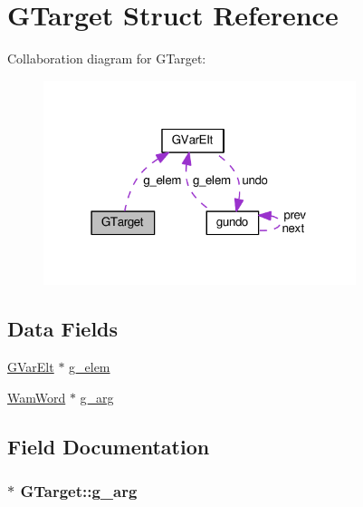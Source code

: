\hypertarget{structGTarget}{}\section{G\+Target Struct Reference}
\label{structGTarget}


Collaboration diagram for G\+Target\+:\nopagebreak
\begin{figure}[H]
\begin{center}
\leavevmode
\includegraphics[width=259pt]{structGTarget__coll__graph}
\end{center}
\end{figure}
\subsection*{Data Fields}
\begin{DoxyCompactItemize}
\item 
\hyperlink{structGVarElt}{G\+Var\+Elt} $\ast$ \hyperlink{structGTarget_a057eea84bfa93fdfb38a7bf7d1bea531}{g\+\_\+elem}
\item 
\hyperlink{LINUX__SIGSEGV_8c_a10ea8be8823feb38875b8a9326cbb424}{Wam\+Word} $\ast$ \hyperlink{structGTarget_a46bf65a569e3ed1e726570e6c0f83a31}{g\+\_\+arg}
\end{DoxyCompactItemize}


\subsection{Field Documentation}
\subsubsection[{\texorpdfstring{g\+\_\+arg}{g_arg}}]{$\ast$ G\+Target\+::g\+\_\+arg}\hypertarget{structGTarget_a46bf65a569e3ed1e726570e6c0f83a31}{}\label{structGTarget_a46bf65a569e3ed1e726570e6c0f83a31}
